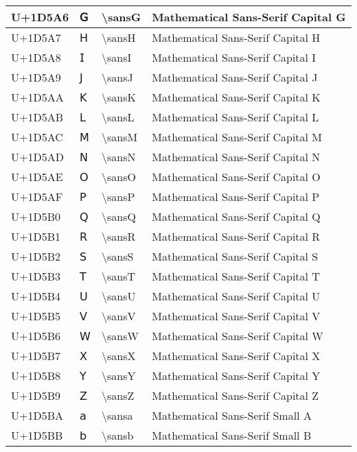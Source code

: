 \begin{table}[h]
\begin{tabulary}{\linewidth}{|L|L|L|L|}
\hline
U+1D5A6 & 𝖦 & {\textbackslash}sansG & Mathematical Sans-Serif Capital G \\
\hline
U+1D5A7 & 𝖧 & {\textbackslash}sansH & Mathematical Sans-Serif Capital H \\
\hline
U+1D5A8 & 𝖨 & {\textbackslash}sansI & Mathematical Sans-Serif Capital I \\
\hline
U+1D5A9 & 𝖩 & {\textbackslash}sansJ & Mathematical Sans-Serif Capital J \\
\hline
U+1D5AA & 𝖪 & {\textbackslash}sansK & Mathematical Sans-Serif Capital K \\
\hline
U+1D5AB & 𝖫 & {\textbackslash}sansL & Mathematical Sans-Serif Capital L \\
\hline
U+1D5AC & 𝖬 & {\textbackslash}sansM & Mathematical Sans-Serif Capital M \\
\hline
U+1D5AD & 𝖭 & {\textbackslash}sansN & Mathematical Sans-Serif Capital N \\
\hline
U+1D5AE & 𝖮 & {\textbackslash}sansO & Mathematical Sans-Serif Capital O \\
\hline
U+1D5AF & 𝖯 & {\textbackslash}sansP & Mathematical Sans-Serif Capital P \\
\hline
U+1D5B0 & 𝖰 & {\textbackslash}sansQ & Mathematical Sans-Serif Capital Q \\
\hline
U+1D5B1 & 𝖱 & {\textbackslash}sansR & Mathematical Sans-Serif Capital R \\
\hline
U+1D5B2 & 𝖲 & {\textbackslash}sansS & Mathematical Sans-Serif Capital S \\
\hline
U+1D5B3 & 𝖳 & {\textbackslash}sansT & Mathematical Sans-Serif Capital T \\
\hline
U+1D5B4 & 𝖴 & {\textbackslash}sansU & Mathematical Sans-Serif Capital U \\
\hline
U+1D5B5 & 𝖵 & {\textbackslash}sansV & Mathematical Sans-Serif Capital V \\
\hline
U+1D5B6 & 𝖶 & {\textbackslash}sansW & Mathematical Sans-Serif Capital W \\
\hline
U+1D5B7 & 𝖷 & {\textbackslash}sansX & Mathematical Sans-Serif Capital X \\
\hline
U+1D5B8 & 𝖸 & {\textbackslash}sansY & Mathematical Sans-Serif Capital Y \\
\hline
U+1D5B9 & 𝖹 & {\textbackslash}sansZ & Mathematical Sans-Serif Capital Z \\
\hline
U+1D5BA & 𝖺 & {\textbackslash}sansa & Mathematical Sans-Serif Small A \\
\hline
U+1D5BB & 𝖻 & {\textbackslash}sansb & Mathematical Sans-Serif Small B \\

\end{tabulary}
\end{table}
